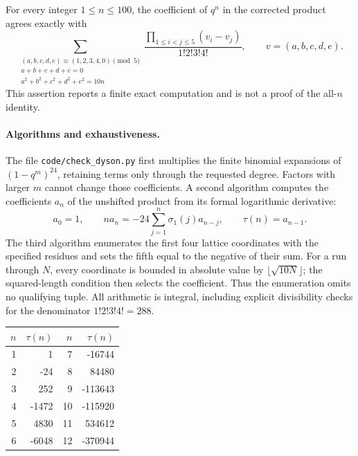 \begin{proposition}\oursComputed{}
For every integer \(1\leq n\leq100\), the coefficient of \(q^n\) in the
corrected product agrees exactly with
\[
\sum_{\substack{
 (a,b,c,d,e)\equiv(1,2,3,4,0)\pmod5\\
 a+b+c+d+e=0\\a^2+b^2+c^2+d^2+e^2=10n}}
\frac{\displaystyle\prod_{1\leq i<j\leq5}(v_i-v_j)}{1!2!3!4!},
\qquad v=(a,b,c,d,e).
\]
This assertion reports a finite exact computation and is not a proof of the
all-\(n\) identity.
\end{proposition}

\paragraph{Algorithms and exhaustiveness.}
The file \texttt{code/check\_dyson.py} first multiplies the finite binomial
expansions of \((1-q^m)^{24}\), retaining terms only through the requested
degree.  Factors with larger \(m\) cannot change those coefficients.  A second
algorithm computes the coefficients \(a_n\) of the unshifted product from
its formal logarithmic derivative:
\[
a_0=1,\qquad
n a_n=-24\sum_{j=1}^{n}\sigma_1(j)a_{n-j},\qquad
\tau(n)=a_{n-1}.
\]
The third algorithm enumerates the first four lattice coordinates with the
specified residues and sets the fifth equal to the negative of their sum.
For a run through \(N\), every coordinate is bounded in absolute value by
\(\lfloor\sqrt{10N}\rfloor\); the squared-length condition then selects
the coefficient.  Thus the enumeration omits no qualifying tuple.  All
arithmetic is integral, including explicit divisibility checks for the
denominator \(1!2!3!4!=288\).

\begin{center}
\begin{tabular}{r r r r}
\toprule
\(n\) & \(\tau(n)\) & \(n\) & \(\tau(n)\)\\
\midrule
1&1&7&-16744\\
2&-24&8&84480\\
3&252&9&-113643\\
4&-1472&10&-115920\\
5&4830&11&534612\\
6&-6048&12&-370944\\
\bottomrule
\end{tabular}
\end{center}

